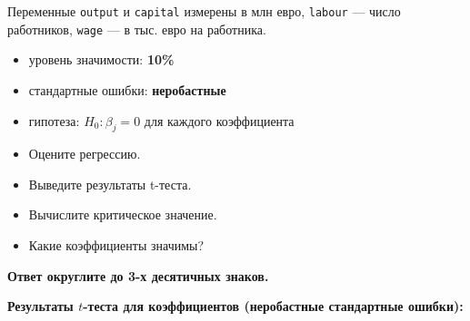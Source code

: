 \documentclass[
  russian,
]{article}
\providecommand{\tightlist}{%
  \setlength{\itemsep}{0pt}\setlength{\parskip}{0pt}}
\begin{document}
Переменные \texttt{output} и \texttt{capital} измерены в млн евро,
\texttt{labour} --- число работников, \texttt{wage} --- в тыс. евро на
работника.

\begin{tcolorbox}[enhanced jigsaw, arc=.35mm, bottomrule=.15mm, bottomtitle=1mm, breakable, colback=white, colbacktitle=quarto-callout-important-color!10!white, colframe=quarto-callout-important-color-frame, coltitle=black, left=2mm, leftrule=.75mm, opacityback=0, opacitybacktitle=0.6, rightrule=.15mm, title=\textcolor{quarto-callout-important-color}{\faExclamation}\hspace{0.5em}{Условия теста}, titlerule=0mm, toprule=.15mm, toptitle=1mm]

\begin{itemize}
\tightlist
\item
  уровень значимости: \textbf{10\%}
\item
  стандартные ошибки: \textbf{неробастные}
\item
  гипотеза: \(H_0:\beta_j=0\) для каждого коэффициента
\end{itemize}

\end{tcolorbox}

\begin{itemize}
\tightlist
\item
  Оцените регрессию.
\item
  Выведите результаты t-теста.
\item
  Вычислите критическое значение.
\item
  Какие коэффициенты значимы?
\end{itemize}

\textbf{Ответ округлите до 3-х десятичных знаков.}

\textbf{Результаты \(t\)-теста для коэффициентов (неробастные
стандартные ошибки):}
\end{document}
